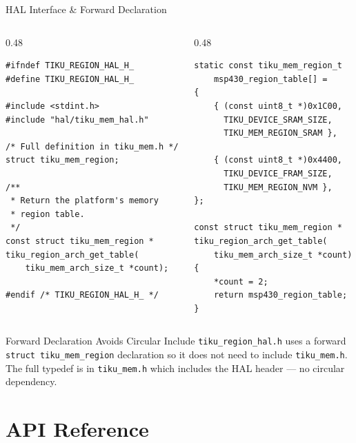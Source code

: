 \documentclass[aspectratio=169, 10pt]{beamer}
\begin{document}
\begin{frame}[fragile]{HAL Interface \& Forward Declaration}
\begin{columns}[T]
\begin{column}{0.48\textwidth}
\begin{lstlisting}[style=cstyle, title={hal/tiku\_region\_hal.h}]
#ifndef TIKU_REGION_HAL_H_
#define TIKU_REGION_HAL_H_

#include <stdint.h>
#include "hal/tiku_mem_hal.h"

/* Full definition in tiku_mem.h */
struct tiku_mem_region;

/**
 * Return the platform's memory
 * region table.
 */
const struct tiku_mem_region *
tiku_region_arch_get_table(
    tiku_mem_arch_size_t *count);

#endif /* TIKU_REGION_HAL_H_ */
\end{lstlisting}
\end{column}

\begin{column}{0.48\textwidth}
\begin{lstlisting}[style=cstyle, title={MSP430 arch implementation}]
static const tiku_mem_region_t
    msp430_region_table[] =
{
    { (const uint8_t *)0x1C00,
      TIKU_DEVICE_SRAM_SIZE,
      TIKU_MEM_REGION_SRAM },

    { (const uint8_t *)0x4400,
      TIKU_DEVICE_FRAM_SIZE,
      TIKU_MEM_REGION_NVM },
};

const struct tiku_mem_region *
tiku_region_arch_get_table(
    tiku_mem_arch_size_t *count)
{
    *count = 2;
    return msp430_region_table;
}
\end{lstlisting}
\end{column}
\end{columns}

\vspace{0.3em}
\begin{alertblock}{Forward Declaration Avoids Circular Include}
\texttt{tiku\_region\_hal.h} uses a forward \texttt{struct tiku\_mem\_region}
declaration so it does not need to include \texttt{tiku\_mem.h}. The full
typedef is in \texttt{tiku\_mem.h} which includes the HAL header ---
no circular dependency.
\end{alertblock}
\end{frame}

\section{API Reference}
\end{document}
